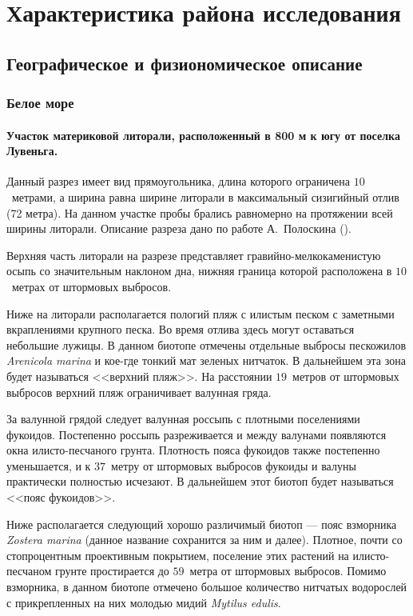 
    \section{Характеристика района исследования}
        \subsection{Географическое и физиономическое описание}
			\subsubsection{Белое море}

\paragraph{Участок материковой литорали, расположенный в 800 м к югу от поселка Лувеньга.}

Данный разрез имеет вид прямоугольника, длина которого ограничена $10$~метрами, а ширина равна ширине литорали в максимальный сизигийный отлив (72 метра). 
На данном участке пробы брались равномерно на протяжении всей ширины литорали. Описание разреза дано по работе А.~Полоскина (\cite*{Poloskin_1996}).

Верхняя часть литорали на разрезе представляет гравийно-мелкокаменистую осыпь со значительным наклоном дна, нижняя граница которой расположена в 
$10$~метрах от штормовых выбросов.

Ниже на литорали располагается пологий пляж с илистым песком с заметными вкраплениями крупного песка. 
Во время отлива здесь могут оставаться небольшие лужицы. 
В данном биотопе отмечены отдельные выбросы пескожилов {\it Arenicola marina} и кое-где тонкий мат зеленых нитчаток. 
В дальнейшем эта зона будет называться <<верхний пляж>>. 
На расстоянии $19$~метров от штормовых выбросов верхний пляж ограничивает валунная гряда.

За валунной грядой следует валунная россыпь с плотными поселениями фукоидов. 
Постепенно россыпь разреживается и между валунами появляются окна илисто-песчаного грунта. 
Плотность пояса фукоидов также постепенно уменьшается, и к $37$~метру от штормовых выбросов фукоиды и валуны практически полностью исчезают. 
В дальнейшем этот биотоп будет называться <<пояс фукоидов>>.

Ниже располагается следующий хорошо различимый биотоп --- пояс взморника {\it Zostera marina} (данное название сохранится за ним и далее). 
Плотное, почти со стопроцентным проективным покрытием, поселение этих растений на илисто-песчаном грунте простирается до $59$~метра от штормовых выбросов. 
Помимо взморника, в данном биотопе отмечено большое количество нитчатых водорослей с прикрепленных на них молодью мидий {\it Mytilus edulis}.

